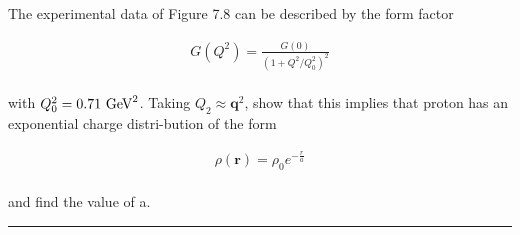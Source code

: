 \begin{problem}{7.8}
    The experimental data of Figure 7.8 can be described by the form factor

    \begin{align*}
        G(Q^2)= \frac{G(0)}{\left( 1+Q^2/Q_0^2 \right)^2}
    \end{align*}\\
    with $Q_0^2 = 0.71 \text{ GeV}^2$. Taking $Q_2 \approx \mathbf{q}^2$, show that this implies that proton has an exponential charge distri-bution of the form

    \begin{align*}
        \rho(\mathbf{r}) = \rho_0 e^{-\frac{r}{a}}
    \end{align*}\\
    and find the value of a.
\end{problem}
\begin{solution}

\end{solution}

\noindent\rule{7in}{1.5pt}

